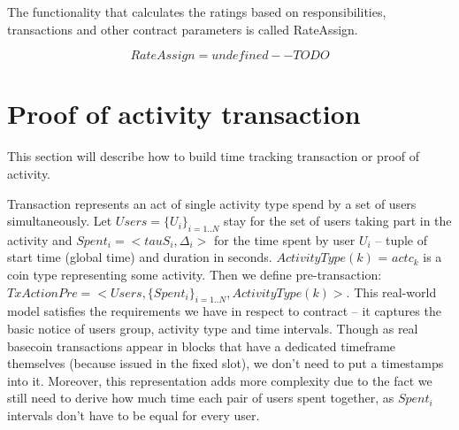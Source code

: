 \documentclass[]{itmo-student-thesis}
\begin{document}
The functionality that calculates the ratings based on
responsibilities, transactions and other contract parameters is called
RateAssign.

$$
RateAssign = undefined -- TODO
$$

\section{Proof of activity transaction}

This section will describe how to build time tracking transaction or
proof of activity.

Transaction represents an act of single activity type spend by a set
of users simultaneously. Let $Users = \{U_i\}_{i=1..N}$ stay for the
set of users taking part in the activity and $Spent_i = <tauS_i,
\Delta_i>$ for the time spent by user $U_i$ -- tuple of start time
(global time) and duration in seconds. $ActivityType(k)$ = $actc_k$ is
a coin type representing some activity. Then we define
pre-transaction: $TxActionPre = <Users, \{Spent_i\}_{i=1..N},
ActivityType(k)>$. This real-world model satisfies the requirements we
have in respect to contract -- it captures the basic notice of users
group, activity type and time intervals. Though as real basecoin
transactions appear in blocks that have a dedicated timeframe
themselves (because issued in the fixed slot), we don’t need to put a
timestamps into it. Moreover, this representation adds more complexity
due to the fact we still need to derive how much time each pair of
users spent together, as $Spent_i$ intervals don’t have to be equal
for every user.
\end{document}
